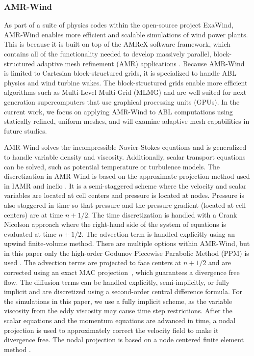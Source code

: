 \subsubsection{AMR-Wind}

As part of a suite of physics codes within the open-source project ExaWind,
AMR-Wind enables more efficient and scalable simulations of wind power plants.
This is because it is built on top of the AMReX software framework, which
contains all of the functionality needed to develop massively parallel,
block-structured adaptive mesh refinement (AMR) applications \cite{AMReX_JOSS}.
Because AMR-Wind is limited to Cartesian block-structured grids, it is
specialized to handle ABL physics and wind turbine wakes.  The block-structured
grids enable more efficient algorithms such as Multi-Level Multi-Grid (MLMG)
\cite{AMReX_JOSS} and are well suited for next generation supercomputers that
use graphical processing units (GPUs).  In the current work, we focus on
applying AMR-Wind to ABL computations using statically refined, uniform meshes,
and will examine adaptive mesh capabilities in future studies.

AMR-Wind solves the incompressible Navier-Stokes equations and is generalized to
handle variable density and viscosity. Additionally, scalar transport equations
can be solved, such as potential temperature or turbulence models. The
discretization in AMR-Wind is based on the approximate projection method used in
IAMR \cite{almgren1998conservative} and incflo \cite{sverdrup2018highly}. It is
a semi-staggered scheme where the velocity and scalar variables are located at
cell centers and pressure is located at nodes. Pressure is also staggered in
time so that pressure and the pressure gradient (located at cell centers) are at
time $n+1/2$.  The time discretization is handled with a Crank Nicolson
approach where the right-hand side of the system of equations is evaluated at
time $n+1/2$. The advection term is handled explicitly using an upwind
finite-volume method. There are multiple options within AMR-Wind, but in this
paper only the high-order Godunov Piecewise Parabolic Method (PPM) is used
\cite{Colella1984}. The advection terms are projected to face centers at $n+1/2$
and are corrected using an exact MAC projection~\cite{almgren1998conservative},
which guarantees a divergence free flow. The diffusion terms can be handled
explicitly, semi-implicitly, or fully implicit and are discretized using a
second-order central difference formula.  For the simulations in this paper, we
use a fully implicit scheme, as the variable viscosity from the eddy viscosity
may cause time step restrictions. After the scalar equations and the momentum
equations are advanced in time, a nodal projection is used to approximately
correct the velocity field to make it divergence free.  The nodal projection is
based on a node centered finite element method \cite{almgren1998conservative}.

